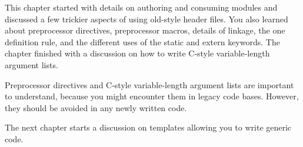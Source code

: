 
This chapter started with details on authoring and consuming modules and discussed a few trickier aspects of using old-style header files. You also learned about preprocessor directives, preprocessor macros, details of linkage, the one definition rule, and the different uses of the static and extern keywords. The chapter finished with a discussion on how to write C-style variable-length argument lists.

Preprocessor directives and C-style variable-length argument lists are important to understand, because you might encounter them in legacy code bases. However, they should be avoided in any newly written code.

The next chapter starts a discussion on templates allowing you to write generic code.